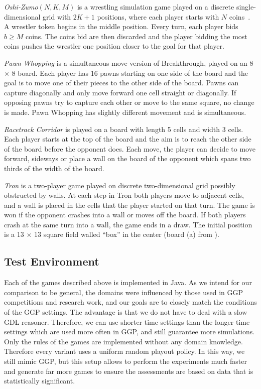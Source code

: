 \documentclass[conference]{IEEEtran}
\begin{document}
\textit{Oshi-Zumo}$(N,K,M)$ is a wrestling simulation game played on a discrete single-dimensional grid with 
$2K+1$ positions, where each player starts with $N$ coins~\cite{Buro03OshiZumo}. A wrestler token begins in the middle 
position. Every turn, 
each player bids $b \ge M$ coins. The coins bid are then discarded and the player bidding the most coins pushes the 
wrestler one position closer to the goal for that player. 

\textit{Pawn Whopping} is a simultaneous move version of Breakthrough, played on an 8 $\times$ 8 board. Each player has 
16 pawns starting on one side of the board and the goal is to move one of their pieces to the other side of the board. 
Pawns can capture diagonally and only move forward one cell straight or diagonally.
If opposing pawns try to capture each other or move to the same square, no change is made. 
Pawn Whopping has slightly different movement and is simultaneous.

\textit{Racetrack Corridor} is played on a board with length 5 cells and width 3 cells. Each player starts at the top of the board and the aim is to reach the other side of the board before the opponent does. Each move, the player can decide to move forward, sideways or place a wall on the board of the opponent which spans two thirds of the width of the board.

\textit{Tron} is a two-player game played on discrete two-dimensional grid possibly obstructed by walls. At each
step in Tron both players move to adjacent cells, and a wall is placed in the cells that the player started on that turn. 
The game is won if the opponent crashes into a wall or moves off the board. If both players crash at the same turn 
into a wall, the game ends in a draw. The initial position is a 13 $\times$ 13 square field walled ``box'' in the 
center (board (a) from \cite{Lanctot13Tron}). 

\subsection{Test Environment}

Each of the games described above is implemented in Java. As we intend for our comparison to be general, the domains were 
influenced by those used in GGP competitions and research work, and our goals are to closely match the conditions of the 
GGP settings. 
The advantage is that we do not have to deal with a slow GDL reasoner. Therefore, we can use shorter time settings than 
the longer time settings which are used more often in GGP, and still guarantee more simulations. Only the rules of the 
games are implemented without any domain knowledge. Therefore every variant uses a uniform random playout policy. 
In this way, we still mimic GGP, but this setup allows to perform 
the experiments much faster and generate far more games to ensure the assessments are based on data that is statistically
significant. 
\end{document}
